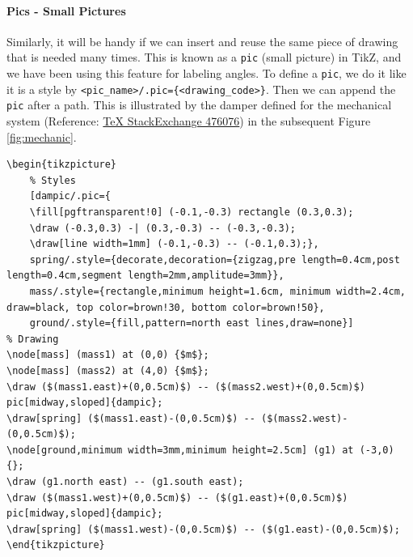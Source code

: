 \paragraph{Pics - Small Pictures}
Similarly, it will be handy if we can insert and reuse the same piece of drawing that is needed many times. This is known as a \texttt{pic} (small picture) in TikZ, and we have been using this feature for labeling angles. To define a \texttt{pic}, we do it like it is a style by \texttt{<pic\_name>/.pic=\{<drawing\_code>\}}. Then we can append the \texttt{pic} after a path. This is illustrated by the damper defined for the mechanical system (Reference: \href{https://tex.stackexchange.com/questions/476076/drawing-mechanical-systems-mass-damper-spring-in-latex}{\TeX{} StackExchange 476076}) in the subsequent Figure \ref{fig:mechanic}.
\begin{lstlisting}
\begin{tikzpicture}
    % Styles
    [dampic/.pic={
    \fill[pgftransparent!0] (-0.1,-0.3) rectangle (0.3,0.3);
    \draw (-0.3,0.3) -| (0.3,-0.3) -- (-0.3,-0.3);
    \draw[line width=1mm] (-0.1,-0.3) -- (-0.1,0.3);},
    spring/.style={decorate,decoration={zigzag,pre length=0.4cm,post length=0.4cm,segment length=2mm,amplitude=3mm}},
    mass/.style={rectangle,minimum height=1.6cm, minimum width=2.4cm, draw=black, top color=brown!30, bottom color=brown!50},
    ground/.style={fill,pattern=north east lines,draw=none}]
% Drawing
\node[mass] (mass1) at (0,0) {$m$};
\node[mass] (mass2) at (4,0) {$m$};
\draw ($(mass1.east)+(0,0.5cm)$) -- ($(mass2.west)+(0,0.5cm)$) pic[midway,sloped]{dampic};
\draw[spring] ($(mass1.east)-(0,0.5cm)$) -- ($(mass2.west)-(0,0.5cm)$);
\node[ground,minimum width=3mm,minimum height=2.5cm] (g1) at (-3,0) {};
\draw (g1.north east) -- (g1.south east);
\draw ($(mass1.west)+(0,0.5cm)$) -- ($(g1.east)+(0,0.5cm)$) pic[midway,sloped]{dampic};
\draw[spring] ($(mass1.west)-(0,0.5cm)$) -- ($(g1.east)-(0,0.5cm)$);
\end{tikzpicture}
\end{lstlisting}

